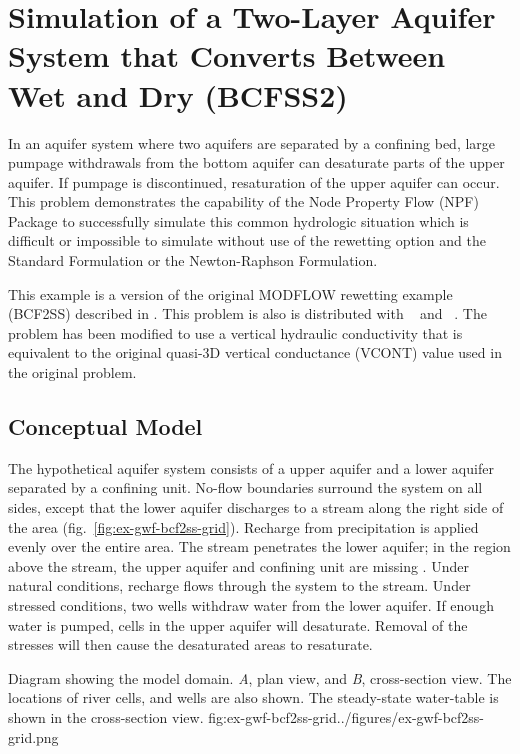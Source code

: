 \section{Simulation of a Two-Layer Aquifer System that Converts Between Wet and Dry (BCFSS2)}

In an aquifer system where two aquifers are separated by a confining bed, large pumpage withdrawals from the bottom aquifer can desaturate parts of the upper aquifer. If pumpage is discontinued, resaturation of the upper aquifer can occur. This problem demonstrates the capability of the Node Property Flow (NPF) Package to successfully simulate this common hydrologic situation which is difficult or impossible to simulate without use of the rewetting option and the Standard Formulation or the Newton-Raphson Formulation.

This example is a version of the original MODFLOW rewetting example (BCF2SS) described in \cite{mcdonaldetal1991wetdry}. This problem is also is distributed with \mff~\citep{modflow2005} and \mf~\citep{modflow6software}. The problem has been modified to use a vertical hydraulic conductivity that is equivalent to the original quasi-3D vertical conductance (VCONT) value used in the original problem.


\subsection{Conceptual Model}

The hypothetical aquifer system consists of a upper aquifer and a lower aquifer separated by a confining unit. No-flow boundaries surround the system on all sides, except that the lower aquifer discharges to a stream along the right side of the area (fig.~\ref{fig:ex-gwf-bcf2ss-grid}). Recharge from precipitation is applied evenly over the entire area. The stream penetrates the lower aquifer; in the region above the stream, the upper aquifer and confining unit are missing  \cite[see][figure~1]{mcdonaldetal1991wetdry}. Under natural conditions, recharge flows through the system to the stream. Under stressed conditions, two wells withdraw water from the lower aquifer. If enough water is pumped, cells in the upper aquifer will desaturate. Removal of the stresses will then cause the desaturated areas to resaturate.


\begin{StandardFigure}{
                                     Diagram showing the model domain. \textit{A}, plan view, and \textit{B}, cross-section 
                                     view. The locations of river cells, and wells are also shown. The steady-state water-table
                                     is shown in the cross-section view.
                                     }{fig:ex-gwf-bcf2ss-grid}{../figures/ex-gwf-bcf2ss-grid.png}
\end{StandardFigure}                                 

